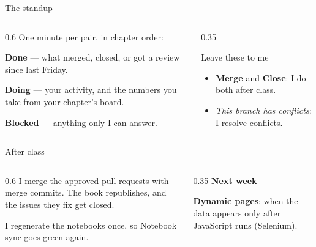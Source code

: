 \documentclass[9pt,aspectratio=169]{beamer}
\begin{document}
\begin{frame}{The standup}
    \begin{columns}
        \begin{column}{0.6\textwidth}
            One minute per pair, in chapter order:

            \medskip

            \textbf{Done} --- what merged, closed, or got a review since last Friday.

            \medskip

            \textbf{Doing} --- your activity, and the numbers you take from your chapter's board.

            \medskip

            \textbf{Blocked} --- anything only I can answer.
        \end{column}
        \begin{column}{0.35\textwidth}
            \begin{alertblock}{Leave these to me}
                \small
                \begin{itemize}
                    \item \textbf{Merge} and \textbf{Close}: I do both after class.
                    \item \textit{This branch has conflicts}: I resolve conflicts.
                \end{itemize}
            \end{alertblock}
        \end{column}
    \end{columns}
\end{frame}

\begin{frame}{After class}
    \begin{columns}
        \begin{column}{0.6\textwidth}
            I merge the approved pull requests with merge commits. The book republishes, and the issues they fix get closed.

            \medskip

            I regenerate the notebooks once, so Notebook sync goes green again.
        \end{column}
        \begin{column}{0.35\textwidth}
            \textbf{Next week}\\[2pt]
            {\footnotesize \textbf{Dynamic pages}: when the data appears only after JavaScript runs (Selenium).\par}
        \end{column}
    \end{columns}
\end{frame}
\end{document}

